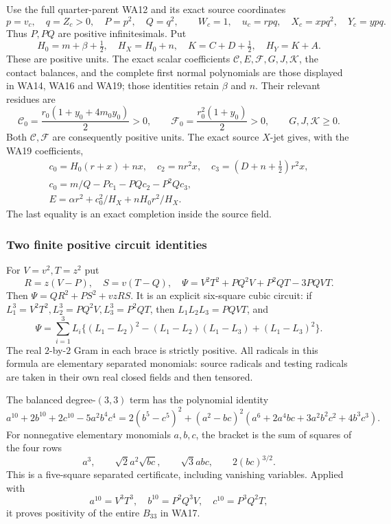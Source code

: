 Use the full quarter-parent WA12 and its exact source coordinates
\[
 p=v_c,\quad q=Z_c>0,\quad P=p^2,\quad Q=q^2,\qquad
 W_c=1,\quad u_c=rpq,\quad X_c=xpq^2,\quad Y_c=ypq.
 \tag{WN1}
\]
Thus \(P,PQ\) are positive infinitesimals. Put
\[
 H_0=m+\beta+\tfrac12,\quad H_X=H_0+n,\quad
 K=C+D+\tfrac12,\quad H_Y=K+A.
 \tag{WN2}
\]
These are positive units. The exact scalar coefficients
\(\mathcal C,E,\mathcal F,G,J,\mathcal K\), the contact balances, and
the complete first normal polynomials are those displayed in
WA14, WA16 and WA19; those identities retain \(\beta\) and \(n\).
Their relevant residues are
\[
 \mathcal C_0=\frac{r_0(1+y_0+4m_0y_0)}2>0,\qquad
 \mathcal F_0=\frac{r_0^2(1+y_0)}2>0,
 \qquad G,J,\mathcal K\geq0 .
 \tag{WN3}
\]
Both \(\mathcal C,\mathcal F\) are consequently positive units.
The exact source \(X\)-jet gives, with the WA19 coefficients,
\[
\begin{gathered}
 c_0=H_0(r+x)+nx,\quad c_2=nr^2x,\quad
 c_3=(D+n+\tfrac12)r^2x,\\
 c_0=m/Q-Pc_1-PQc_2-P^2Qc_3,\\
 E=\alpha r^2+c_0^2/H_X+nH_0r^2/H_X .
\end{gathered}\tag{WN4}
\]
The last equality is an exact completion inside the source field.

\subsubsection*{Two finite positive circuit identities}

For \(V=v^2,T=z^2\) put
\[
 R=z(V-P),\quad S=v(T-Q),\quad
 \Psi=V^2T^2+PQ^2V+P^2QT-3PQVT .
\]
Then \(\Psi=QR^2+PS^2+vzRS\). It is an explicit six-square
cubic circuit: if \(L_1^3=V^2T^2,L_2^3=PQ^2V,L_3^3=P^2QT\),
then \(L_1L_2L_3=PQVT\), and
\[
 \Psi=\sum_{i=1}^3 L_i
 \bigl\{(L_1-L_2)^2-(L_1-L_2)(L_1-L_3)+(L_1-L_3)^2\bigr\}.
 \tag{WN5}
\]
The real \(2\)-by-\(2\) Gram in each brace is strictly positive.
All radicals in this formula are elementary separated monomials:
source radicals and testing radicals are taken in their own real
closed fields and then tensored.

The balanced degree-\((3,3)\) term has the polynomial identity
\[
 a^{10}+2b^{10}+2c^{10}-5a^2b^4c^4
 =2(b^5-c^5)^2
 +(a^2-bc)^2(a^6+2a^4bc+3a^2b^2c^2+4b^3c^3).
 \tag{WN6}
\]
For nonnegative elementary monomials \(a,b,c\), the bracket is the
sum of squares of the four rows
\[
 a^3,\qquad \sqrt2a^2\sqrt{bc},\qquad
 \sqrt3abc,\qquad 2(bc)^{3/2}.
\]
This is a five-square separated certificate, including vanishing
variables. Applied with
\[
 a^{10}=V^3T^3,\quad b^{10}=P^2Q^3V,\quad c^{10}=P^3Q^2T,
\]
it proves positivity of the entire \(B_{33}\) in WA17.

